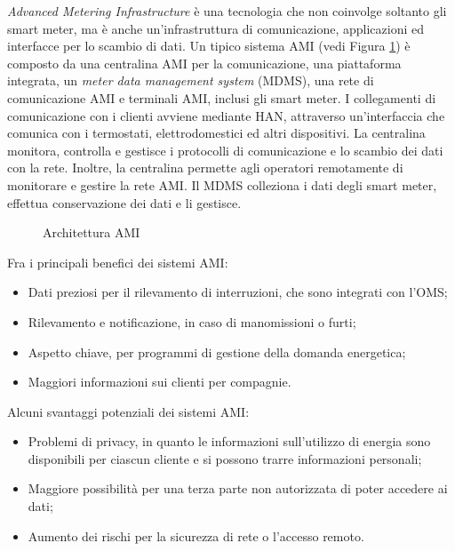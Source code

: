 \emph{Advanced Metering Infrastructure} è una tecnologia che non coinvolge soltanto gli smart meter, ma è anche un'infrastruttura di comunicazione, applicazioni ed interfacce  per lo scambio di dati. Un tipico sistema AMI (vedi Figura \ref{fig:2_12}) è composto da una centralina AMI per la comunicazione, una piattaforma integrata, un \emph{meter data management system} (MDMS), una rete di comunicazione AMI e terminali AMI, inclusi gli smart meter. I collegamenti di comunicazione con i clienti avviene mediante HAN, attraverso un'interfaccia che comunica con i termostati, elettrodomestici ed altri dispositivi. La centralina monitora, controlla e gestisce i protocolli di comunicazione e lo scambio dei dati con la rete. Inoltre, la centralina permette agli operatori remotamente di monitorare  e gestire la rete AMI. Il MDMS colleziona i dati degli smart meter, effettua conservazione dei dati e li gestisce.

\begin{figure}[h] 
\caption{Architettura AMI}\label{fig:2_12}
\end{figure}

Fra i principali benefici dei sistemi AMI:
\begin{itemize}
	\item Dati preziosi per il rilevamento di interruzioni, che sono integrati con l'OMS;
	\item Rilevamento e notificazione, in caso di manomissioni o furti;
	\item Aspetto chiave, per programmi di gestione della domanda energetica;
	\item Maggiori informazioni sui clienti per compagnie.
\end{itemize}
Alcuni svantaggi potenziali dei sistemi AMI:
\begin{itemize}
	\item Problemi di privacy, in quanto le informazioni sull'utilizzo di energia sono disponibili per ciascun cliente e si possono trarre informazioni personali;
	\item Maggiore possibilità per una terza parte non autorizzata di poter accedere ai dati;
	\item Aumento dei rischi per la sicurezza di rete o l'accesso remoto.
\end{itemize}
 
